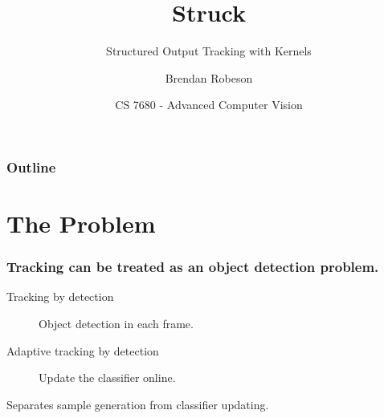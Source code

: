 \documentclass[mathserif,handout]{beamer}
\title{Struck}
\subtitle{Structured Output Tracking with Kernels}
\author{Brendan Robeson}
\date[CS 7680]{CS 7680 - Advanced Computer Vision}
\institute{Utah State University}
\begin{document}
\begin{frame}
    \titlepage
\end{frame}

\begin{frame}
    \frametitle{Outline}
    \tableofcontents
\end{frame}

\section{The Problem}

\begin{frame}
    \frametitle{Tracking can be treated as an object detection problem.}
    \begin{description}
        \item [Tracking by detection] Object detection in each frame.
        \item [Adaptive tracking by detection] Update the classifier online.
    \end{description}

    Separates sample generation from classifier updating.
\end{frame}

%
%
%

\end{document}
